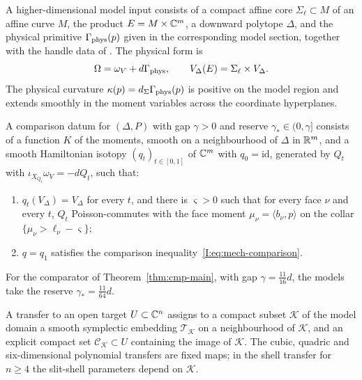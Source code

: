 \begin{definition}\label{def:mech-model}
A higher-dimensional model input consists of a compact affine core $\Sigma_\ell\subset M$ of an affine
curve $M$, the product $E=M\times\mathbb{C}^m$, a downward polytope $\Delta$, and the physical primitive
$\Gamma_{\rm phys}(p)$ given in the corresponding model section, together with the handle data of
. The physical form is
\[
 \Omega=\omega_V+d\Gamma_{\rm phys},\qquad
 V_\Delta(E)=\Sigma_\ell\times V_\Delta.
\]
The physical curvature $\kappa(p)=d_\Sigma\Gamma_{\rm phys}(p)$ is positive on the model region and extends
smoothly in the moment variables across the coordinate hyperplanes.
\end{definition}

\begin{definition}\label{def:mech-datum}
A comparison datum for $(\Delta,P)$ with gap $\gamma>0$ and reserve $\gamma_*\in(0,\gamma]$ consists of a function
$K$ of the moments, smooth on a neighbourhood of $\Delta$ in $\mathbb{R}^m$, and a smooth Hamiltonian isotopy
$(q_t)_{t\in[0,1]}$ of $\mathbb{C}^m$ with $q_0=\mathrm{id}$, generated by $Q_t$ with $\iota_{X_{Q_t}}\omega_V=-dQ_t$,
such that:
\begin{enumerate}[label=(\arabic*),ref=(\arabic*)]
\item\label{it:mech-datum-collar} $q_t(V_\Delta)=V_\Delta$ for every $t$, and there is $\varsigma>0$ such that
 for every face $\nu$ and every $t$, $Q_t$ Poisson-commutes with the face moment $\mu_\nu=\langle b_\nu,p\rangle$ on
 the collar $\{\mu_\nu>\ell_\nu-\varsigma\}$;
\item\label{it:mech-datum-cmp} $q=q_1$ satisfies the comparison inequality~\eqref{I:eq:mech-comparison}.
\end{enumerate}
For the comparator of Theorem~\ref{thm:cmp-main}, with gap $\gamma=\frac{11}{16}d$, the models take the reserve
$\gamma_*=\frac{11}{64}d$.
\end{definition}

\begin{definition}[Transfer]\label{def:mech-transfer}
A transfer to an open target $U\subset\mathbb{C}^n$ assigns to a compact subset $\mathcal K$ of the model
domain a smooth symplectic embedding $\mathcal T_{\mathcal K}$ on a neighbourhood of $\mathcal K$,
and an explicit compact set $\mathcal C_{\mathcal K}\subset U$ containing the image of $\mathcal K$.
The cubic, quadric and six-dimensional polynomial transfers are fixed maps; in the shell transfer for
$n\ge4$ the slit-shell parameters depend on $\mathcal K$.
\end{definition}

